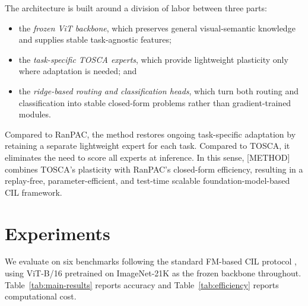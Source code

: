 \documentclass{article}
\begin{document}
The architecture is built around a division of labor between three parts:

\begin{itemize}
    \item the \emph{frozen ViT backbone}, which preserves general
    visual-semantic knowledge and supplies stable task-agnostic features;
    \item the \emph{task-specific TOSCA experts}, which provide lightweight
    plasticity only where adaptation is needed; and
    \item the \emph{ridge-based routing and classification heads}, which turn
    both routing and classification into stable closed-form problems rather
    than gradient-trained modules.
\end{itemize}

Compared to RanPAC, the method restores ongoing task-specific adaptation by
retaining a separate lightweight expert for each task. Compared to TOSCA, it
eliminates the need to score all experts at inference. In this sense,
[METHOD] combines TOSCA's plasticity with RanPAC's closed-form efficiency,
resulting in a replay-free, parameter-efficient, and test-time scalable
foundation-model-based CIL framework.

\section{Experiments}
\label{sec:experiments}

We evaluate on six benchmarks following the standard FM-based CIL protocol
\citep{zhou2024revisiting,zhou2024expandable}, using ViT-B/16 pretrained on
ImageNet-21K as the frozen backbone throughout. Table~\ref{tab:main-results}
reports accuracy and Table~\ref{tab:efficiency} reports computational cost.
\end{document}
